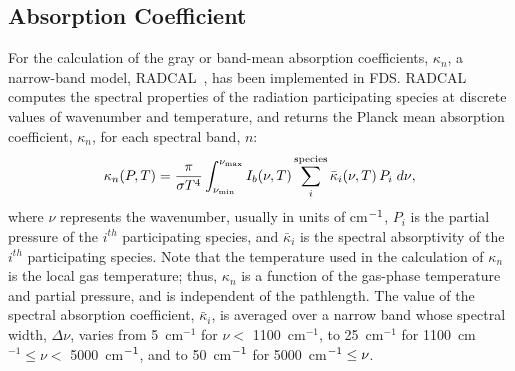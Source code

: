 \subsection{Absorption Coefficient}

For the calculation of the gray or band-mean absorption coefficients,
$\kappa_n$, a narrow-band model, RADCAL~\cite{RadCal}, has been
implemented in FDS. RADCAL computes the spectral properties of the
radiation participating species at discrete values of wavenumber and temperature,
and returns the Planck mean absorption coefficient, $\kappa_n$, for each spectral band, $n$:
\begin{equation}
\kappa_n(P,T) = \dfrac{\pi}{\sigma T^4}
\displaystyle\int_{\nu_{\rm min}}^{\nu_{\rm max}}{I_b(\nu,T)
\displaystyle\sum_{i}^{\rm species} \bar{\kappa}_i(\nu,T) \, P_i \; d\nu},
\end{equation}
where $\nu$ represents the wavenumber, usually in units of cm$^{\rm -1}$,
$P_i$ is the partial pressure of the $i^{th}$ participating species, and
$\bar{\kappa}_i$ is the spectral absorptivity of the $i^{th}$ participating species.
Note that the temperature used in the calculation of $\kappa_n$ is
the local gas temperature; thus, $\kappa_n$ is a function
of the gas-phase temperature and partial pressure,
and is independent of the pathlength. The value of the spectral absorption coefficient, $\bar{\kappa}_i$,
is averaged over a narrow band whose spectral width, $\Delta \nu$, varies from
5~cm$^{-1}$ for $\nu < $ 1100~cm$^{-1}$, to
25~cm$^{-1}$ for 1100~cm$^{-1} \leq \nu < $ 5000~cm$^{\rm -1}$,
and to 50~cm$^{\rm -1}$ for 5000~cm$^{\rm -1}\leq \nu$.

